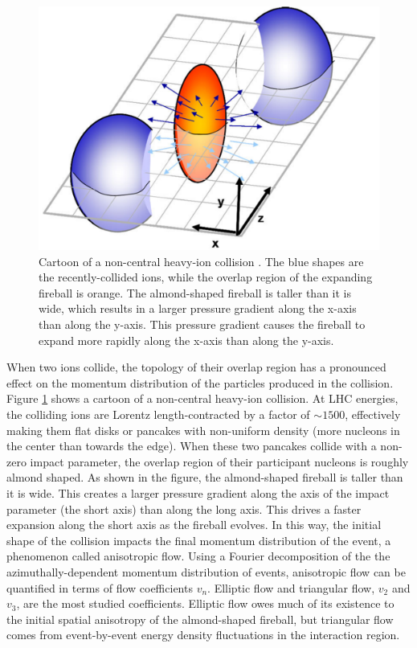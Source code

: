 \begin{figure}[hbt]
\includegraphics[width=36pc]{Figures/BorrowedFigures/Almond.pdf}
\caption[Non-central collision]{ 
Cartoon of a non-central heavy-ion collision \cite{Rapp:2008qc}.
The blue shapes are the recently-collided ions, while the overlap region of the expanding fireball is orange.
The almond-shaped fireball is taller than it is wide, which results in a larger pressure gradient along the x-axis than along the y-axis.
This pressure gradient causes the fireball to expand more rapidly along the x-axis than along the y-axis.
}
\label{fig:Almond}
\end{figure}
When two ions collide, the topology of their overlap region has a pronounced effect on the momentum distribution of the particles produced in the collision.
Figure \ref{fig:Almond} shows a cartoon of a non-central heavy-ion collision.
At LHC energies, the colliding ions are Lorentz length-contracted by a factor of $\sim 1500$, effectively making them flat disks or pancakes with non-uniform density (more nucleons in the center than towards the edge).
When these two pancakes collide with a non-zero impact parameter, the overlap region of their participant nucleons is roughly almond shaped.
As shown in the figure, the almond-shaped fireball is taller than it is wide.
This creates a larger pressure gradient along the axis of the impact parameter (the short axis) than along the long axis.
This drives a faster expansion along the short axis as the fireball evolves.
In this way, the initial shape of the collision impacts the final momentum distribution of the event, a phenomenon called anisotropic flow.
Using a Fourier decomposition of the the azimuthally-dependent momentum distribution of events, anisotropic flow can be quantified in terms of flow coefficients $v_n$.
Elliptic flow and triangular flow, $v_2$ and $v_3$,  are the most studied coefficients.
Elliptic flow owes much of its existence to the initial spatial anisotropy of the almond-shaped fireball, but triangular flow comes from event-by-event energy density fluctuations in the interaction region.

